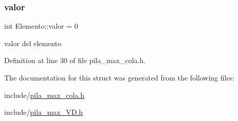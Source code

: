 \mbox{\label{structElemento_a2fd2452d8e9cbe64efec8ca6c7f7b7eb}} 
\subsubsection{\texorpdfstring{valor}{valor}}
{\footnotesize\ttfamily int Elemento\+::valor = 0}

valor del elemento 

Definition at line 30 of file pila\+\_\+max\+\_\+cola.\+h.



The documentation for this struct was generated from the following files\+:\begin{DoxyCompactItemize}
\item 
include/\hyperlink{pila__max__cola_8h}{pila\+\_\+max\+\_\+cola.\+h}\item 
include/\hyperlink{pila__max__VD_8h}{pila\+\_\+max\+\_\+\+V\+D.\+h}\end{DoxyCompactItemize}
